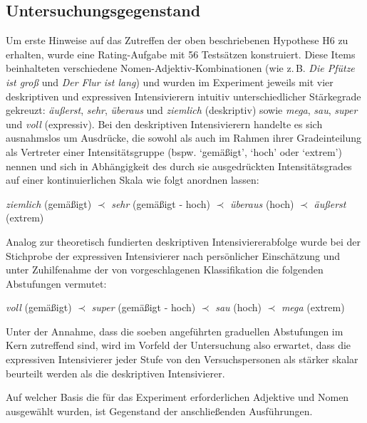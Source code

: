 \subsection{Untersuchungsgegenstand}\label{abs:Untersuchungsgegenstand63}
Um erste Hinweise auf das Zutreffen der oben beschriebenen {Hypothese H6} zu erhalten, wurde eine Rating-Aufgabe mit 56 Testsätzen konstruiert. Diese Items beinhalteten verschiedene Nomen-Adjektiv-Kombinationen (wie z.\,B. \textit{Die Pfütze ist groß} und \textit{Der Flur ist lang}) und wurden im Experiment jeweils mit vier deskriptiven und expressiven Intensivierern intuitiv unterschiedlicher Stärkegrade gekreuzt: \textit{äußerst}, \textit{sehr}, \textit{überaus} und \textit{ziemlich} (deskriptiv) sowie \textit{mega}, \textit{sau}, \textit{super} und \textit{voll} (expressiv). Bei den deskriptiven Intensivierern handelte es sich ausnahmslos um Ausdrücke, die sowohl {\citet[87]{Biedermann.1969}} als auch \citet[408]{Breindl.2007} im Rahmen ihrer Gradeinteilung als Vertreter einer Intensitätsgruppe (bspw. `gemäßigt', `hoch' oder `extrem') nennen und sich in Abhängigkeit des durch sie ausgedrückten Intensitätsgrades auf einer kontinuierlichen Skala wie folgt anordnen lassen: \medskip

\noindent \textit{ziemlich} (gemäßigt) $\prec$ \textit{sehr} (gemäßigt - hoch) $\prec$ \textit{überaus} (hoch) $\prec$ \textit{äußerst} (extrem) \par  \medskip

\noindent Analog zur theoretisch fundierten deskriptiven Intensiviererabfolge wurde bei der Stichprobe der expressiven Intensivierer nach persönlicher Einschätzung und unter Zuhilfenahme der von \citet[408]{Breindl.2007} vorgeschlagenen Klassifikation die folgenden Abstufungen vermutet: \medskip

\noindent \textit{voll} (gemäßigt) $\prec$ \textit{super} (gemäßigt - hoch) $\prec$ \textit{sau} (hoch) $\prec$ \textit{mega} (extrem) \medskip

\noindent Unter der Annahme, dass die soeben angeführten graduellen Abstufungen im Kern zutreffend sind, wird im Vorfeld der Untersuchung also erwartet, dass die expressiven Intensivierer jeder Stufe von den Versuchspersonen als stärker skalar beurteilt werden als die deskriptiven Intensivierer.


Auf welcher Basis die für das Experiment erforderlichen Adjektive und Nomen ausgewählt wurden, ist Gegenstand der {anschließenden Ausführungen}.


